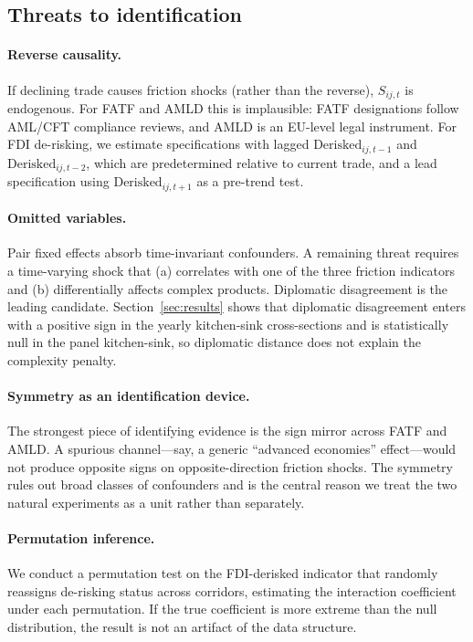 \subsection{Threats to identification}

\paragraph{Reverse causality.} If declining trade causes friction shocks (rather than the reverse), $S_{ij,t}$ is endogenous. For FATF and AMLD this is implausible: FATF designations follow AML/CFT compliance reviews, and AMLD is an EU-level legal instrument. For FDI de-risking, we estimate specifications with lagged $\text{Derisked}_{ij,t-1}$ and $\text{Derisked}_{ij,t-2}$, which are predetermined relative to current trade, and a lead specification using $\text{Derisked}_{ij,t+1}$ as a pre-trend test.

\paragraph{Omitted variables.} Pair fixed effects absorb time-invariant confounders. A remaining threat requires a time-varying shock that (a) correlates with one of the three friction indicators and (b) differentially affects complex products. Diplomatic disagreement is the leading candidate. Section~\ref{sec:results} shows that diplomatic disagreement enters with a positive sign in the yearly kitchen-sink cross-sections and is statistically null in the panel kitchen-sink, so diplomatic distance does not explain the complexity penalty.

\paragraph{Symmetry as an identification device.} The strongest piece of identifying evidence is the sign mirror across FATF and AMLD. A spurious channel---say, a generic ``advanced economies'' effect---would not produce opposite signs on opposite-direction friction shocks. The symmetry rules out broad classes of confounders and is the central reason we treat the two natural experiments as a unit rather than separately.

\paragraph{Permutation inference.} We conduct a permutation test on the FDI-derisked indicator that randomly reassigns de-risking status across corridors, estimating the interaction coefficient under each permutation. If the true coefficient is more extreme than the null distribution, the result is not an artifact of the data structure.
